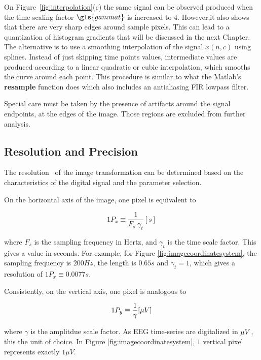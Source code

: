 On Figure~\ref{fig:interpolation}(c) the same signal can be observed produced when the time scaling factor $\gls{gammat}$ is increased to $4$. However,it also shows that there are very sharp edges around sample pixels.  This can lead to a quantization of histogram gradients that will be discussed in the next Chapter. The alternative is to use a smoothing interpolation of the signal $\tilde{x}(n,c)$ using splines.  Instead of just skipping time points values, intermediate values are produced according to a linear quadratic or cubic interpolation, which smooths the curve around each point.  This procedure is similar to what the Matlab's \textbf{resample} function does which also includes an antialiasing FIR lowpass filter.

Special care must be taken by the presence of artifacts around the signal endpoints, at the edges of the image. Those regions are excluded from further analysis.

\subsection{Resolution and Precision}

The resolution~\cite{Cohen2014} of the image transformation can be determined based on the characteristics of the digital signal and the parameter selection.

On the horizontal axis of the image, one pixel is equivalent to 

\begin{equation}
1 P_x \equiv \frac{1}{F_s  \; \gamma_t}  [\si{s}]
\label{eq:resolutionx}
\end{equation}

\noindent where $F_s$ is the sampling frequency in Hertz, and $\gamma_t$ is the time scale factor.  This gives a value in seconds.  For example, for Figure \ref{fig:imagecoordinatesystem}, the sampling frequency is $200 Hz$, the length is $0.65 s$ and $\gamma_t = 1$, which gives a resolution of $1 P_x \equiv 0.0077 s$. 

Consistently, on the vertical axis, one pixel is analogous to 

\begin{equation}
1 P_y \equiv \frac{1}{\gamma}  [\si\mu{V}]
\label{eq:resolutiony}
\end{equation}

\noindent where $\gamma$ is the amplitdue scale factor.  As EEG time-series are digitalized in $\si\mu{V}$, this the unit of choice.  In Figure \ref{fig:imagecoordinatesystem}, $1$ vertical pixel represents exactly $1 \mu V$.

